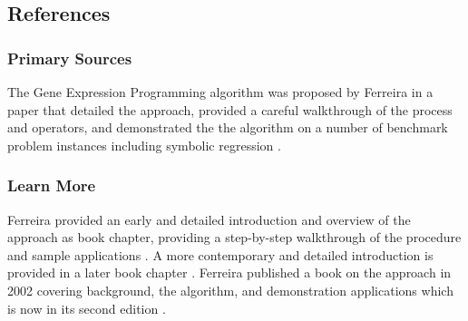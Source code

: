 


\subsection{References}

% 
% 
\subsubsection{Primary Sources}
The Gene Expression Programming algorithm was proposed by Ferreira in a paper that detailed the approach, provided a careful walkthrough of the process and operators, and demonstrated the the algorithm on a number of benchmark problem instances including symbolic regression \cite{Ferreira2001}.

% 
% 
\subsubsection{Learn More}
Ferreira provided an early and detailed introduction and overview of the approach as book chapter, providing a step-by-step walkthrough of the procedure and sample applications \cite{Ferreira2002}. A more contemporary and detailed introduction is provided in a later book chapter \cite{Ferreira2005}.
Ferreira published a book on the approach in 2002 covering background, the algorithm, and demonstration applications which is now in its second edition \cite{Ferreira2006}.


